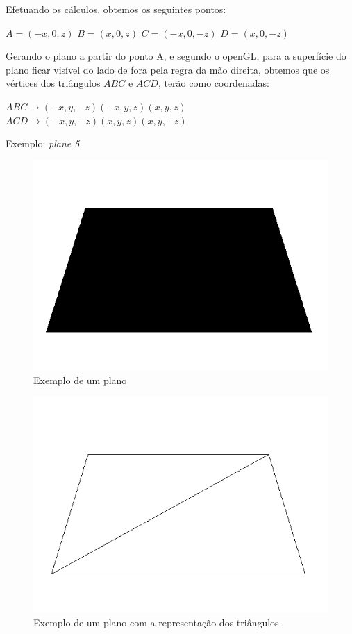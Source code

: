 \documentclass{article}
\begin{document}
Efetuando os cálculos, obtemos os seguintes pontos: \newline
\begin{center}
$A = (-x,0,z)$ \newline 
$B = (x,0,z)$ \newline 
$C = (-x,0,-z)$ \newline 
$D = (x,0,-z)$ \newline
\end{center}
Gerando o plano a partir do ponto A, e segundo o openGL, para a superfície do plano ficar visível do lado de fora pela regra da mão direita,
obtemos que os vértices dos triângulos $ABC$ e $ACD$, terão como coordenadas: \newline
\begin{center}
$ABC\rightarrow (-x,y,-z) (-x,y,z) (x,y,z) $ \newline
$ACD\rightarrow (-x,y,-z) (x,y,z) (x,y,-z)$ \newline
\end{center}
Exemplo: \textit{plane 5}
\begin{figure}[H]
\centering\includegraphics[scale=0.45]{planoP} 
\caption{\label{fig:controller}Exemplo de um plano}
\end{figure} \begin{figure}[H]
\centering\includegraphics[scale=0.45]{planoT} 
\caption{\label{fig:controller}Exemplo de um plano com a representação dos triângulos}
\end{figure} 
\end{document}
